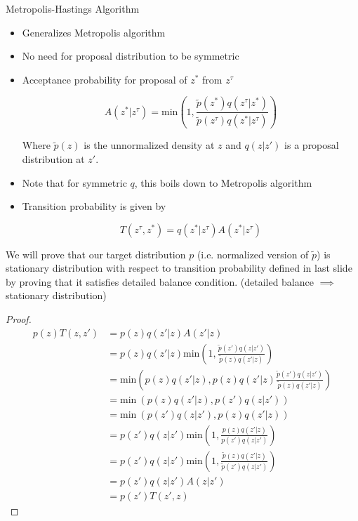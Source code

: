 \documentclass[pdf]{beamer}
\begin{document}
\begin{frame}{Metropolis-Hastings Algorithm}
  \begin{itemize}
  \item Generalizes Metropolis algorithm
  \item No need for proposal distribution to be symmetric
  \item Acceptance probability for proposal of $z^*$ from $z^\tau$

    \[
      A(z^*|z^\tau) = \text{min} \left( 1, \frac{\tilde{p}(z^*) q(z^\tau|z^*)}{\tilde{p}(z^\tau) q(z^*|z^\tau)} \right)
    \]

    Where $\tilde{p}(z)$ is the unnormalized density at $z$ and $q(z|z')$ is a proposal distribution at $z'$.
  \item Note that for symmetric $q$, this boils down to Metropolis algorithm
  \item Transition probability is given by

    \[
      T(z^\tau, z^*) = q(z^*|z^\tau) A(z^*| z^\tau)
    \]
    
  \end{itemize}
\end{frame}

\begin{frame}
  We will prove that our target distribution $p$ (i.e. normalized version of $\tilde{p}$) is stationary distribution with respect to transition probability defined in last slide by proving that it satisfies detailed balance condition. (detailed balance $\implies$ stationary distribution)

\end{frame}
\begin{frame}[shrink]
  \begin{proof}
    \begin{align*}
      p(z)T(z, z') &= p(z) q(z'|z) A(z'|z) \\
                   &= p(z) q(z'|z)  \text{min} \left( 1, \frac{\tilde{p}(z') q(z|z')}{\tilde{p}(z) q(z'|z)} \right) \\
                   &= \text{min} \left( p(z) q(z'|z) , p(z) q(z'|z) \frac{\tilde{p}(z') q(z|z')}{\tilde{p}(z) q(z'|z)} \right) \\
                   &= \text{min} \ ( p(z) q(z'|z) , p(z') q(z|z')) \\
                   &= \text{min} \ ( p(z') q(z|z') , p(z) q(z'|z)) \\
                   &=  p(z') q(z|z') \text{min} \left(1 , \frac{p(z) q(z'|z)}{p(z') q(z|z')}\right) \\
                   &=  p(z') q(z|z') \text{min} \left(1 , \frac{\tilde{p}(z) q(z'|z)}{\tilde{p}(z') q(z|z')}\right)\\
                   &= p(z') q(z|z') A(z|z') \\
                   &= p(z') T(z', z)
    \end{align*}
  \end{proof}
\end{frame}
\end{document}
